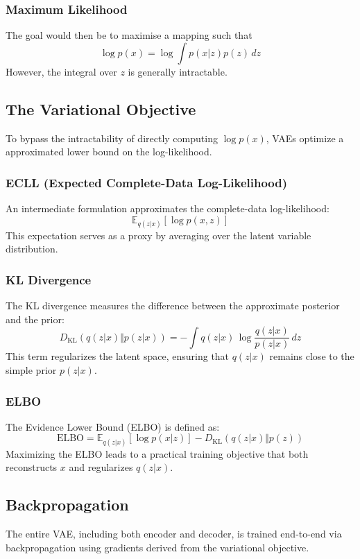 \documentclass{article}
\begin{document}
\subsubsection{Maximum Likelihood}
The goal would then be to maximise a mapping such that
\[
\log p(x) = \log \int p(x|z)p(z)\,dz
\]
However, the integral over \(z\) is generally intractable.

\subsection{The Variational Objective}
To bypass the intractability of directly computing \(\log p(x)\), VAEs optimize a approximated lower bound on the log-likelihood.

\subsubsection{ECLL (Expected Complete-Data Log-Likelihood)}
An intermediate formulation approximates the complete-data log-likelihood:
\[
\mathbb{E}_{q(z|x)}[\log p(x,z)]
\]
This expectation serves as a proxy by averaging over the latent variable distribution.

\subsubsection{KL Divergence}
The KL divergence measures the difference between the approximate posterior and the prior:
\[
D_{\text{KL}}(q(z|x) \Vert p(z|x)) = -\int q(z|x)\,\log \frac{q(z|x)}{p(z|x)} \,dz
\]
This term regularizes the latent space, ensuring that \(q(z|x)\) remains close to the simple prior \(p(z|x)\).

\subsubsection{ELBO}
The Evidence Lower Bound (ELBO) is defined as:
\[
\text{ELBO} = \mathbb{E}_{q(z|x)}[\log p(x|z)] - D_{\text{KL}}(q(z|x) \Vert p(z))
\]
Maximizing the ELBO leads to a practical training objective that both reconstructs \(x\) and regularizes \(q(z|x)\).

\subsection{Backpropagation}
The entire VAE, including both encoder and decoder, is trained end-to-end via backpropagation using gradients derived from the variational objective.
\end{document}
